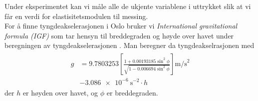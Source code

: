 \documentclass[%
 reprint,
 amsmath,amssymb,
 aps,
 norsk,
 booktabs
]{revtex4-1}
\begin{document}
Under eksperimentet kan vi måle alle de ukjente variablene i uttrykket slik at vi får en verdi for elastisitetsmodulen til messing.\\
For å finne tyngdeakselerasjonen i Oslo bruker vi \textit{International gravitational formula (IGF)} som tar hensyn til breddegraden og høyde over havet under beregningen av tyngdeakselerasjonen \cite{gravity}. Man beregner da tyngdeakselrasjonen med
\begin{align}
\begin{split}
  g &= 9.7803253\left[\frac{1+0.00193185\sin^2{\phi}}{\sqrt{1-0.006694\sin^2{\phi}}}\right]\text{m/s}^2\\
      &- \SI{3.086e-6}{\second^{-2}}\cdot h \label{calc_g}
\end{split}
\end{align}
der $h$ er høyden over havet, og $\phi$ er breddegraden.
\end{document}
